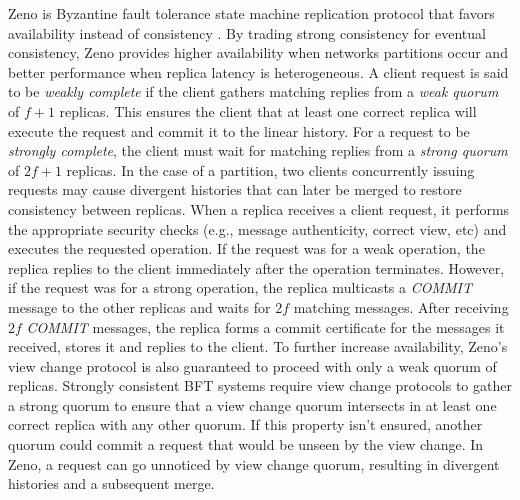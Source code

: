 \documentclass[runningheads,a4paper]{llncs}
\begin{document}
Zeno is Byzantine fault tolerance state machine replication protocol that favors availability instead of consistency \cite{Singh2009}. By trading strong consistency for eventual consistency, Zeno provides higher availability when networks partitions occur and better performance when replica latency is heterogeneous.  A client request is said to be \textit{weakly complete} if the client gathers matching replies from a \textit{weak quorum} of $f+1$ replicas. This ensures the client that at least one correct replica will execute the request and commit it to the linear history. For a request to be \textit{strongly complete}, the client must wait for matching replies from a \textit{strong quorum} of $2f+1$ replicas. In the case of a partition, two clients concurrently issuing requests may cause divergent histories that can later be merged to restore consistency between replicas. When a replica receives a client request, it performs the appropriate security checks (e.g., message authenticity, correct view, etc) and executes the requested operation. If the request was for a weak operation, the replica replies to the client immediately after the operation terminates. However, if the request was for a strong operation, the replica multicasts a \textit{COMMIT} message to the other replicas and waits for $2f$ matching messages. After receiving $2f$ \textit{COMMIT} messages, the replica forms a commit certificate for the messages it received, stores it and replies to the client. To further increase availability, Zeno's view change protocol is also guaranteed to proceed with only a weak quorum of replicas. Strongly consistent BFT systems require view change protocols to gather a strong quorum to ensure that a view change quorum intersects in at least one correct replica with any other quorum. If this property isn't ensured, another quorum could commit a request that would be unseen by the view change. In Zeno, a request can go unnoticed by view change quorum, resulting in divergent histories and a subsequent merge. 
\end{document}
